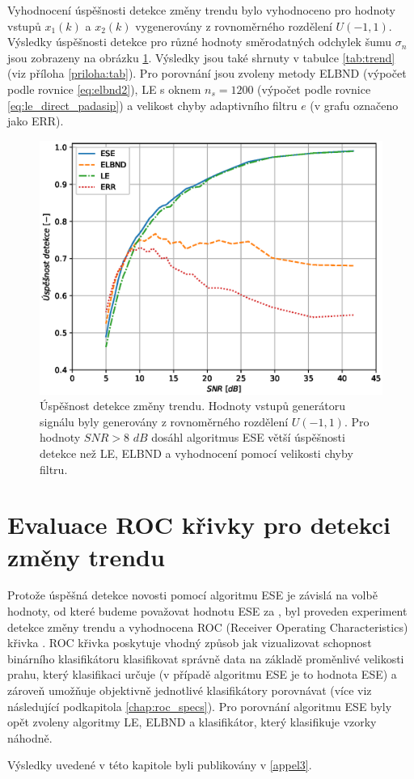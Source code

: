 Vyhodnocení úspěšnosti detekce změny trendu bylo vyhodnoceno pro hodnoty vstupů $x_1(k)$ a $x_2(k)$ vygenerovány z rovnoměrného rozdělení $U(-1,1)$. Výsledky úspěšnosti detekce pro různé hodnoty směrodatných odchylek šumu $\sigma_n$ jsou zobrazeny na obrázku \ref{fig:trend_stats}. Výsledky jsou také shrnuty v tabulce \ref{tab:trend} (viz příloha \ref{priloha:tab}). Pro porovnání jsou zvoleny metody ELBND (výpočet podle rovnice \ref{eq:elbnd2}), LE s oknem $n_s=1200$ (výpočet podle rovnice \ref{eq:le_direct_padasip}) a velikost chyby adaptivního filtru $e$ (v grafu označeno jako ERR).

\begin{figure}[!ht]
    \centering
    \includegraphics[scale=0.66]{IMG/mdpi/trendchange_stats.eps}
    \caption{Úspěšnost detekce změny trendu. Hodnoty vstupů generátoru signálu byly generovány z rovnoměrného rozdělení $U(-1,1)$. Pro hodnoty $SNR > 8$ $dB$ dosáhl algoritmus ESE větší úspěšnosti detekce než LE, ELBND a vyhodnocení pomocí velikosti chyby filtru.}
    \label{fig:trend_stats}
\end{figure}


\section{Evaluace ROC křivky pro detekci změny trendu}\label{chap:appel_roc}
Protože úspěšná detekce novosti pomocí algoritmu ESE je závislá na volbě hodnoty, od které budeme považovat hodnotu ESE za , byl proveden experiment detekce změny trendu a vyhodnocena ROC (Receiver Operating Characteristics) křivka \cite{roc_orig}. ROC křivka poskytuje vhodný způsob jak vizualizovat schopnost binárního klasifikátoru klasifikovat správně data na základě proměnlivé velikosti prahu, který klasifikaci určuje (v případě algoritmu ESE je to hodnota ESE) a zároveň umožňuje objektivně jednotlivé klasifikátory porovnávat \cite{roc_bible} (více viz následující podkapitola \ref{chap:roc_specs}). Pro porovnání algoritmu ESE byly opět zvoleny algoritmy LE, ELBND a klasifikátor, který klasifikuje vzorky náhodně.
\par Výsledky uvedené v této kapitole byli publikovány v \ref{appel3}.
